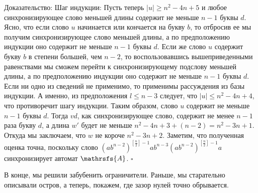 \documentclass[11pt]{article}
\newenvironment{proof}{Доказательство:}{$\square$}
\begin{document}
\begin{proof}
Шаг индукции: Пусть теперь $|u| \geq n^2 - 4n + 5$ и любое синхронизирующее слово меньшей длины содержит не меньше $n - 1$ буквы $d$.
Ясно, что если слово $u$ начинается или кончается на букву $b$, то отбросив ее мы получим синхронизирующее слово меньшей длины, а по
предположению индукции оно содержит не меньше $n - 1$ буквы $d$. Если же слово $u$ содержит букву $b$ в степени большей, чем $n - 2$,
то воспользовавшись вышеприведенными равенствами мы сможем перейти к синхронизирующему подслову меньшей длины, а по
предположению индукции оно содержит не меньше $n - 1$ буквы $d$. Если ни одно из сведений не применимо, то применимы рассуждения
из базы индукции. А именно, из предположения $l \leq n - 3$ следует, что $|u| \leq n^2 - 4n + 4$, что противоречит шагу индукции.
Таким образом, слово $u$ содержит не меньше $n - 1$ буквы $d$.
Тогда $vd$, как синхронизирующее слово, содержит не менее $n - 1$ раза букву $d$, 
а длина $w'$ будет не меньше $n^2 - 4n + 3 + (n - 2) = n^2 - 3n + 1$.
Откуда мы заключаем, что $w$ не короче $n^2 - 3n + 2$. Заметим, что полученная оценка точна, поскольку слово 
$(ab^{n - 2})^{\left[\frac{n}{2}\right] - 1}ab^{n - 3}(ab^{n - 2})^{\left[\frac{n}{2}\right] - 1}a$ 
синхронизирует автомат $\mathrsfs{A}$.
\end{proof}

В конце, мы решили забубенить ограничители. Раньше, мы старательно описывали остров, а теперь, покажем,
где зазор нулей точно обрывается.
\end{document}
